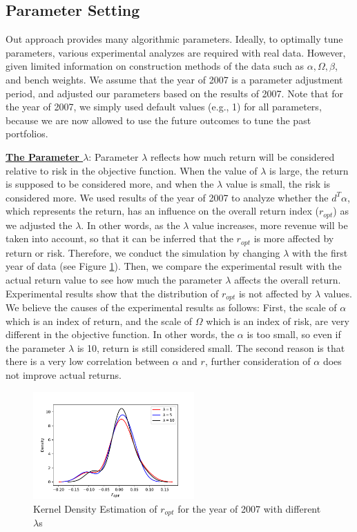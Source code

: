 \documentclass[11pt]{article}
\begin{document}
	
	
\subsection{Parameter Setting}
	Out approach provides many algorithmic parameters. Ideally, to optimally tune parameters, various experimental analyzes are required with real data. However, given limited information on construction methods of the data such as $\alpha, \Omega, \beta$, and bench weights. We assume that the year of 2007 is a parameter adjustment period, and adjusted our parameters based on the results of 2007. Note that for the year of 2007, we simply used default values (e.g., 1) for all parameters, because we are now allowed to use the future outcomes to tune the past portfolios. 
	
	\underline{\textbf{The Parameter $\lambda$}}: Parameter $ \lambda $ reflects how much return will be considered relative to risk in the objective function. When the value of $ \lambda $ is large, the return is supposed to be considered more, and when the $\lambda$ value is small, the risk is considered more. We used results of the year of 2007 to analyze whether the $d^{T} \alpha$, which represents the return, has an influence on the overall return index ($r_{opt}$) as we adjusted the $\lambda$. In other words, as the $\lambda$ value increases, more revenue will be taken into account, so that it can be inferred that the $r_{opt}$  is more affected by return or risk. Therefore, we conduct the simulation by changing $ \lambda $ with the first year of data (see Figure \ref{fig:lambda}). Then, we compare the experimental result with the actual return value to see how much the parameter $ \lambda $ affects the overall return. Experimental results show that the distribution of $r_{opt}$  is not affected by $\lambda$ values. We believe the causes of the experimental results as follows: First, the scale of $\alpha$ which is an index of return, and the scale of $\Omega$ which is an index of risk, are very different in the objective function. In other words, the $\alpha$ is too small, so even if the parameter $\lambda$ is 10, return is still considered small. The second reason is that there is a very low correlation between $\alpha$ and $r$, further consideration of $\alpha$ does not improve actual returns. 
		\begin{figure}[] 
		\begin{center}
			\includegraphics[width=0.55\textwidth]{lambda}
			\caption{Kernel Density Estimation of $r_{opt}$ for the year of 2007 with different $\lambda$s } \label{fig:lambda}
		\end{center}
	\end{figure}
	
\end{document}
